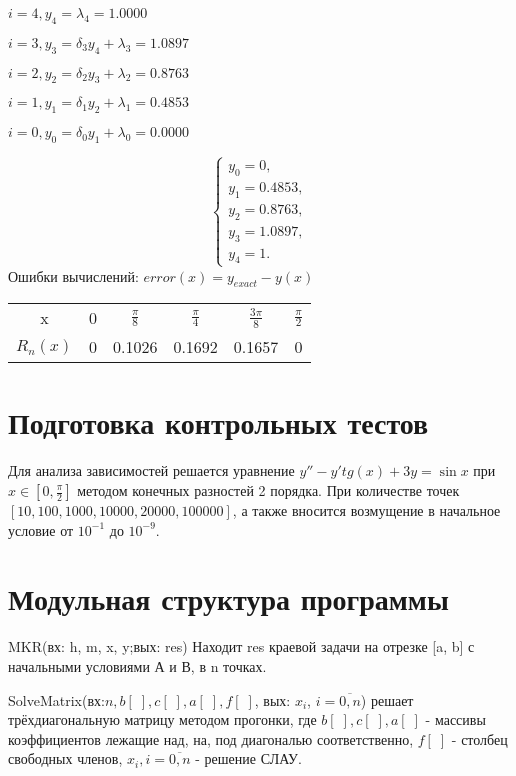 \documentclass{article}
\begin{document}
	$i = 4 , y_4 = \lambda_4 = 1.0000$
	
	$i = 3 , y_3 = \delta_3y_{4} + \lambda_3 = 1.0897$
	
	$i = 2 , y_2 = \delta_2y_{3} + \lambda_2 = 0.8763$
	
	$i = 1 , y_1 = \delta_1y_{2} + \lambda_1 = 0.4853$
	
	$i = 0 , y_0 = \delta_0y_{1} + \lambda_0 = 0.0000$

	\begin{equation*}
		\begin{cases}
			y_0 = 0, 
			\\
			y_1 = 0.4853,
			\\
			y_2 = 0.8763,
			\\
			y_3 = 1.0897,
			\\
			y_4 = 1.
		\end{cases}
	\end{equation*}
	Ошибки вычислений: $error(x) = y_{exact} - y(x)$
	\begin{center}
	\begin{tabular}{ |c|c|c|c|c|c|} 
		\hline
		x & 0 & $\frac{\pi}{8}$ & $\frac{\pi}{4}$ & $\frac{3\pi}{8}$ & $\frac{\pi}{2}$   \\ 
		$R_n(x)$ & 0 & 0.1026 & 0.1692 & 0.1657 & 0  \\ 
		\hline
	\end{tabular}
\end{center}
	\section{Подготовка контрольных тестов}
	\paragraph{}Для анализа зависимостей решается уравнение
	$y'' - y'tg(x) + 3y = \sin{x}$ при $x \in [0, \frac{\pi}{2}]$ методом конечных разностей 2 порядка. При количестве точек $[10, 100, 1000, 10000, 20000, 100000]$, а также вносится возмущение в начальное
	условие от $10^{-1}$ до $10^{-9}$.
	
	\section{Модульная структура программы}
	MKR(вх: h, m, x, y;вых: res) Находит res краевой задачи
	на отрезке [a, b] с начальными условиями А и В, в n точках.
	
	SolveMatrix(вх:$n, b[\;], c[\;], a[\;], f[\;]$, вых: $x_i$, $i = \overline{0,n}$) решает трёхдиагональную матрицу методом прогонки, где $b[\;], c[\;], a[\;]$ -  массивы коэффициентов лежащие над, на, под диагональю соответственно, $f[\;]$ - столбец свободных членов, $x_i , i = \overline{0,n}$ - решение СЛАУ.
\end{document}
